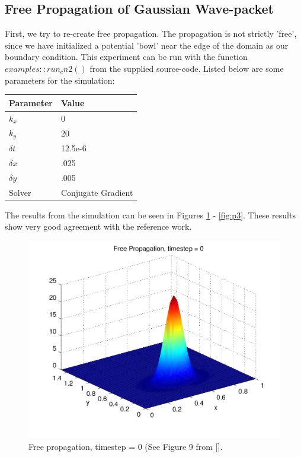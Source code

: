 \documentclass[letterpaper,12pt]{article}
\begin{document}
\subsection{Free Propagation of Gaussian Wave-packet}

First, we try to re-create free propagation.  The propagation is not strictly 'free', since we have initialized a potential 'bowl' near the edge of the domain as our boundary condition.  This experiment can be run with the function $examples::run_cn2()$ from the supplied source-code. Listed below are some parameters for the simulation:

\begin{center}
    \begin{tabular}{ | l | l  |}
    \hline
    Parameter & Value  \\ \hline
	$k_x$ & 0  \\ \hline
	$k_y$ & 20  \\ \hline    
	$\delta t$ & 12.5e-6  \\ \hline    
    $\delta x$ & .025  \\ \hline    
    $\delta y$ & .005  \\ \hline    
    Solver & Conjugate Gradient  \\ \hline            
    \hline
    \end{tabular}
\end{center}

The results from the simulation can be seen in Figures \ref{fig:p1} - \ref{fig:p3}.  These results show very good agreement with the reference work.

\begin{figure}[!htbp]
\centering
\includegraphics[scale=0.55,trim = 2mm 20mm 12mm 15mm,clip=true]{prop1.png}
\caption{Free propagation, timestep = 0 (See Figure 9 from [].}
\label{fig:p1}
\end{figure}
\end{document}
